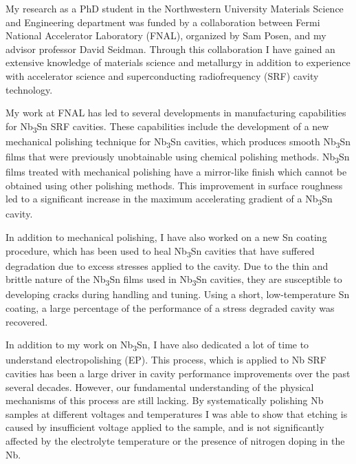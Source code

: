 \documentclass[]{revtex4-2}
\begin{document}
    My research as a PhD student in the Northwestern University Materials Science and Engineering department was funded by a collaboration between Fermi National Accelerator Laboratory (FNAL), organized by Sam Posen, and my advisor professor David Seidman. Through this collaboration I have gained an extensive knowledge of materials science and metallurgy in addition to experience with accelerator science and superconducting radiofrequency (SRF) cavity technology. 

    My work at FNAL has led to several developments in manufacturing capabilities for Nb\textsubscript{3}Sn SRF cavities. These capabilities include the development of a new mechanical polishing technique for Nb\textsubscript{3}Sn cavities, which produces smooth Nb\textsubscript{3}Sn films that were previously unobtainable using chemical polishing methods.\cite{10.1088/1361-6668/ad0b2d} Nb\textsubscript{3}Sn films treated with mechanical polishing have a mirror-like finish which cannot be obtained using other polishing methods. This improvement in surface roughness led to a significant increase in the maximum accelerating gradient of a Nb\textsubscript{3}Sn cavity.
    
    In addition to mechanical polishing, I have also worked on a new Sn coating procedure, which has been used to heal Nb\textsubscript{3}Sn cavities that have suffered degradation due to excess stresses applied to the cavity. Due to the thin and brittle nature of the Nb\textsubscript{3}Sn films used in Nb\textsubscript{3}Sn cavities, they are susceptible to developing cracks during handling and tuning. Using a short, low-temperature Sn coating, a large percentage of the performance of a stress degraded cavity was recovered.

    In addition to my work on Nb\textsubscript{3}Sn, I have also dedicated a lot of time to understand electropolishing (EP). This process, which is applied to Nb SRF cavities has been a large driver in cavity performance improvements over the past several decades. However, our fundamental understanding of the physical mechanisms of this process are still lacking. By systematically polishing Nb samples at different voltages and temperatures I was able to show that etching is caused by insufficient voltage applied to the sample, and is not significantly affected by the electrolyte temperature or the presence of nitrogen doping in the Nb.\cite{viklund:srf2021-supcav016}
\end{document}
